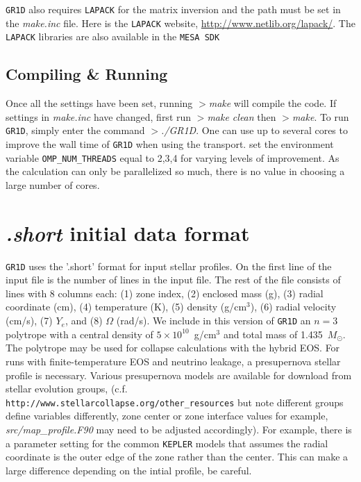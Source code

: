 \documentclass[10pt,nofootinbib]{article}
\newcommand{\code}[1]{\texttt{#1}}
\begin{document}
\code{GR1D} also requires \code{LAPACK} for the matrix inversion and
the path must be set in the \emph{make.inc} file.  Here is the
\code{LAPACK} website, \url{http://www.netlib.org/lapack/}.  The
\code{LAPACK} libraries are also available in the \code{MESA SDK}

\subsection{Compiling \& Running}
Once all the settings have been set, running {\emph{$>$make}} will
compile the code.  If settings in {\emph{make.inc}} have changed,
first run {\emph{$>$make clean}} then {\emph{$>$make}}.  To run
\code{GR1D}, simply enter the command {\emph{$>$./GR1D}}. One can use
up to several cores to improve the wall time of \code{GR1D} when using
the transport.  set the environment variable \code{OMP\_NUM\_THREADS}
equal to 2,3,4 for varying levels of improvement.  As the calculation
can only be parallelized so much, there is no value in choosing a
large number of cores.
 
\section{{\it.short} initial data format}
\code{GR1D} uses the '.short' format for input stellar profiles. On
the first line of the input file is the number of lines in the input
file.  The rest of the file consists of lines with 8 columns each: (1)
zone index, (2) enclosed mass (g), (3) radial coordinate (cm), (4)
temperature (K), (5) density (g/cm$^3$), (6) radial velocity (cm/s),
(7) $Y_e$, and (8) $\Omega$ (rad/s). We include in this version of
\code{GR1D} an $n=3$ polytrope with a central density of
$5\times10^{10}$~g/cm$^3$ and total mass of 1.435~$M_\odot$. The
polytrope may be used for collapse calculations with the hybrid
EOS. For runs with finite-temperature EOS and neutrino leakage, a
presupernova stellar profile is necessary.  Various presupernova
models are available for download from stellar evolution groups,
(c.f. {\tt http://www.stellarcollapse.org/other\_resources} but note
different groups define variables differently, zone center or zone
interface values for example, {\emph{src/map\_profile.F90}} may need to
be adjusted accordingly). For example, there is a parameter setting
for the common \code{KEPLER} models that assumes the radial coordinate
is the outer edge of the zone rather than the center.  This can make a
large difference depending on the intial profile, be careful.
\end{document}
